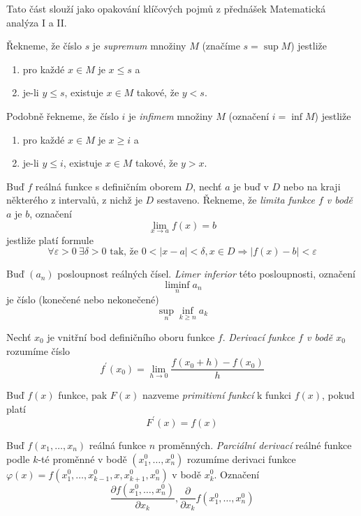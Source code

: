 Tato část slouží jako opakování klíčových pojmů z přednášek Matematická analýza I a II.

\begin{definice}
Řekneme, že číslo $s$ je \emph{supremum} množiny $M$ (značíme $s = \sup M$) jestliže
\begin{enumerate}
\item pro každé $x \in M$ je $x \leq s$ a
\item je-li $y \leq s$, existuje $x \in M$ takové, že $y < s$.
\end{enumerate}

Podobně řekneme, že číslo $i$ je \emph{infimem} množiny $M$ (označení $i = \inf M$) jestliže
\begin{enumerate}
\item pro každé $x \in M$ je $x \geq i$ a
\item je-li $y \leq i$, existuje $x \in M$ takové, že $y > x$.
\end{enumerate}
\end{definice}

\begin{definice}
Buď $f$ reálná funkce s definičním oborem $D$, nechť $a$ je buď v $D$ nebo na kraji některého z intervalů, z nichž je $D$ sestaveno. Řekneme, že \emph{limita funkce $f$ v bodě $a$} je $b$, označení
$$\lim_{x \to a} f(x) = b$$
jestliže platí formule
$$\forall \varepsilon > 0 \ \exists \delta > 0 \textrm{ tak, že } 0 < |x-a| < \delta, x \in D \Rightarrow |f(x) - b| < \varepsilon$$
\end{definice}

\begin{definice}
Buď $(a_n)$ posloupnost reálných čísel. \emph{Limer inferior} této posloupnosti, označení
$$\liminf_n a_n$$
je číslo (konečené nebo nekonečené)
$$\sup_n \inf_{k \geq n} a_k$$
\end{definice}


\begin{definice}
Nechť $x_0$ je vnitřní bod definičního oboru funkce $f$. \emph{Derivací funkce $f$ v bodě $x_0$} rozumíme číslo
$$f^\prime(x_0) = \lim_{h \to 0} \frac{f(x_0+h) - f(x_0)}{h}$$
\end{definice}

\begin{definice}
Buď $f(x)$ funkce, pak $F(x)$ nazveme \emph{primitivní funkcí} k funkci $f(x)$, pokud platí
$$F^\prime(x) = f(x)$$
\end{definice}

\begin{definice}
Buď $f(x_1, \ldots, x_n)$ reálná funkce $n$ proměnných. \emph{Parciální derivací} reálné funkce podle $k$-té proměnné v bodě $(x_1^0, \ldots, x_n^0)$ rozumíme derivaci funkce $\varphi(x) = f(x_1^0, \ldots, x_{k-1}^0, x, x_{k+1}^0, x_n^0)$ v bodě $x_k^0$. Označení
$$\frac{\partial f(x_1^0, \ldots, x_n^0)}{\partial x_k}, \frac{\partial}{\partial x_k} f(x_1^0, \ldots, x_n^0)$$
\end{definice}

